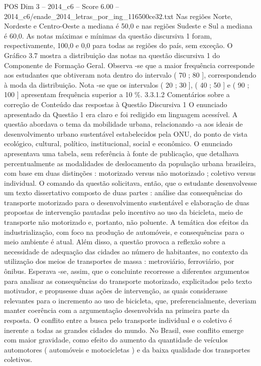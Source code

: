 \begin{textsample}{POS Dim 3 – 2014\_c6 – Score 6.00 – 2014\_c6/enade\_2014\_letras\_por\_ing\_116500ce32.txt}
Nas regiões Norte, Nordeste e Centro-Oeste a mediana é 50,0 e nas regiões Sudeste e Sul a mediana é 60,0.
As notas máximas e mínimas da questão discursiva 1 foram, respectivamente, 100,0 e 0,0 para todas as regiões do país, sem exceção.
O Gráfico 3.7 mostra a distribuição das notas na questão discursiva 1 do Componente de Formação Geral.
Observa -se que a maior frequência corresponde aos estudantes que obtiveram nota dentro do intervalo ( 70 ; 80 ], correspondendo à moda da distribuição.
Nota -se que os intervalos ( 20 ; 30 ], ( 40 ; 50 ] e ( 90 ; 100 ] apresentam frequência superior a 10 \%. 3.3.1.2 Comentários sobre a correção de Conteúdo das respostas à Questão Discursiva 1 O enunciado apresentado da Questão 1 era claro e foi redigido em linguagem acessível.
A questão abordava o tema da mobilidade urbana, relacionando -a aos ideais de desenvolvimento urbano sustentável estabelecidos pela ONU, do ponto de vista ecológico, cultural, político, institucional, social e econômico.
O enunciado apresentava uma tabela, sem referência à fonte de publicação, que detalhava percentualmente as modalidades de deslocamento da população urbana brasileira, com base em duas distinções : motorizado versus não motorizado ; coletivo versus individual.
O comando da questão solicitava, então, que o estudante desenvolvesse um texto dissertativo composto de duas partes : análise das consequências do transporte motorizado para o desenvolvimento sustentável e elaboração de duas propostas de intervenção pautadas pelo incentivo ao uso da bicicleta, meio de transporte não motorizado e, portanto, não poluente.
A temática dos efeitos da industrialização, com foco na produção de automóveis, e consequências para o meio ambiente é atual.
Além disso, a questão provoca a reflexão sobre a necessidade de adequação das cidades ao número de habitantes, no contexto da utilização dos meios de transportes de massa : metroviário, ferroviário, por ônibus.
Esperava -se, assim, que o concluinte recorresse a diferentes argumentos para analisar as consequências do transporte motorizado, explicitados pelo texto motivador, e propusesse duas ações de intervenção, as quais considerasse relevantes para o incremento ao uso de bicicleta, que, preferencialmente, deveriam manter coerência com a argumentação desenvolvida na primeira parte da resposta.
O conflito entre a busca pelo transporte individual e o coletivo é inerente a todas as grandes cidades do mundo.
No Brasil, esse conflito emerge com maior gravidade, como efeito do aumento da quantidade de veículos automotores ( automóveis e motocicletas ) e da baixa qualidade dos transportes coletivos.

\end{textsample}
